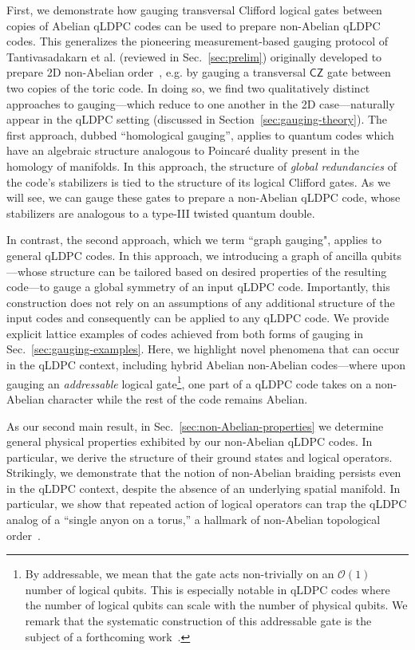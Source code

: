 \documentclass[aps,prx,reprint,superscriptaddress,nofootinbib]{revtex4-2}
\theoremstyle{definition}
\newcommand{\<}{\langle}
\renewcommand{\>}{\rangle}
\begin{document}
First, we demonstrate how gauging transversal Clifford logical gates between copies of Abelian qLDPC codes can be used to prepare non-Abelian qLDPC codes. 
%
This generalizes the pioneering measurement-based gauging protocol of Tantivasadakarn et al. (reviewed in Sec.~\ref{sec:prelim}) originally developed to prepare 2D non-Abelian order~\cite{Hierarchy}, e.g. by gauging a transversal $\mathsf{CZ}$ gate between two copies of the toric code.
%
In doing so, we find two qualitatively distinct approaches to gauging---which reduce to one another in the 2D case---naturally appear in the qLDPC setting (discussed in Section~\ref{sec:gauging-theory}). 
%
The first approach, dubbed ``homological gauging'', applies to quantum codes which have an algebraic structure analogous to Poincar\'e duality present in the homology of manifolds.
%
In this approach, the structure of \textit{global redundancies} of the code's stabilizers is tied to the structure of its logical Clifford gates. 
%
As we will see, we can gauge these gates to prepare a non-Abelian qLDPC code, whose stabilizers are analogous to a type-III twisted quantum double.
%


%

In contrast, the second approach, which we term ``graph gauging", applies to general qLDPC codes.
%
In this approach, we introducing a graph of ancilla qubits---whose structure can be tailored based on desired properties of the resulting code---to gauge a global symmetry of an input qLDPC code. 
%
Importantly, this construction does not rely on an assumptions of any additional structure of the input codes and consequently can be applied to any qLDPC code.
%
We provide explicit lattice examples of codes achieved from both forms of gauging in Sec.~\ref{sec:gauging-examples}.
%
Here, we highlight novel phenomena that can occur in the qLDPC context, including hybrid Abelian non-Abelian codes---where upon gauging an \textit{addressable} logical gate\footnote{By addressable, we mean that the gate acts non-trivially on an $\mathcal{O}(1)$ number of logical qubits.
%
This is especially notable in qLDPC codes where the number of logical qubits can scale with the number of physical qubits.
%
We remark that the systematic construction of this addressable gate is the subject of a forthcoming work~\cite{addressablegates}.}, one part of a qLDPC code takes on a non-Abelian character while the rest of the code remains Abelian.

As our second main result, in Sec.~\ref{sec:non-Abelian-properties} we determine general physical properties exhibited by our non-Abelian qLDPC codes.
%
In particular, we derive the structure of their ground states and logical operators.
%
Strikingly, we demonstrate that the notion of non-Abelian braiding persists even in the qLDPC context, despite the absence of an underlying spatial manifold. In particular, we show that repeated action of logical operators can trap the qLDPC analog of a ``single anyon on a torus,'' a hallmark of non-Abelian topological order~\cite{bombin_family_2008,Iqbal_2024}.
%
\end{document}
